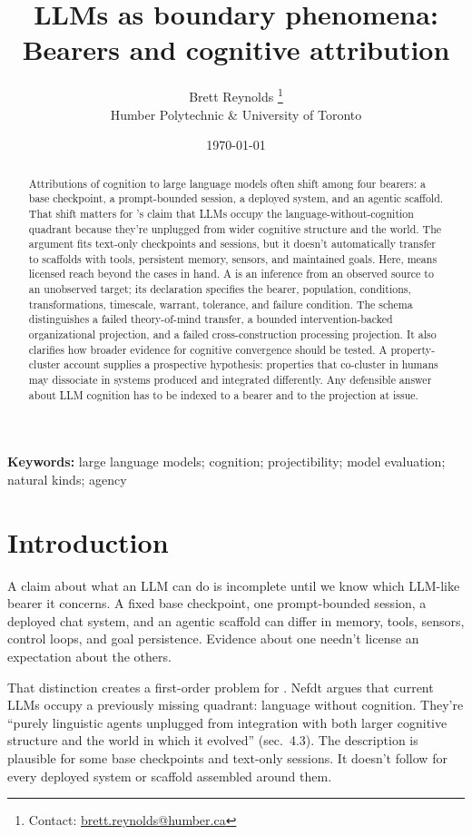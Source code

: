 \documentclass[12pt]{article}
\title{LLMs as boundary phenomena: Bearers and cognitive attribution}
\author{Brett Reynolds \orcidlink{0000-0003-0073-7195}%
\thanks{Contact: \href{mailto:brett.reynolds@humber.ca}{brett.reynolds@humber.ca}}\\
Humber Polytechnic \& University of Toronto}
\date{\today}
\begin{document}
\maketitle

\begin{abstract}
Attributions of cognition to large language models often shift among four bearers: a base checkpoint, a prompt-bounded session, a deployed system, and an agentic scaffold. That shift matters for \textcite{nefdt2026}'s claim that LLMs occupy the language-without-cognition quadrant because they're unplugged from wider cognitive structure and the world. The argument fits text-only checkpoints and sessions, but it doesn't automatically transfer to scaffolds with tools, persistent memory, sensors, and maintained goals. Here,  means licensed reach beyond the cases in hand. A  is an inference from an observed source to an unobserved target; its declaration specifies the bearer, population, conditions, transformations, timescale, warrant, tolerance, and failure condition. The schema distinguishes a failed theory-of-mind transfer, a bounded intervention-backed organizational projection, and a failed cross-construction processing projection. It also clarifies how broader evidence for cognitive convergence should be tested. A property-cluster account supplies a prospective hypothesis: properties that co-cluster in humans may dissociate in systems produced and integrated differently. Any defensible answer about LLM cognition has to be indexed to a bearer and to the projection at issue.
\end{abstract}

\noindent\textbf{Keywords:} large language models; cognition; projectibility; model evaluation; natural kinds; agency

\section{Introduction}

A claim about what an LLM can do is incomplete until we know which LLM-like bearer it concerns. A fixed base checkpoint, one prompt-bounded session, a deployed chat system, and an agentic scaffold can differ in memory, tools, sensors, control loops, and goal persistence. Evidence about one needn't license an expectation about the others.

That distinction creates a first-order problem for \textcite{nefdt2026}. Nefdt argues that current LLMs occupy a previously missing quadrant: language without cognition. They're \enquote{purely linguistic agents unplugged from integration with both larger cognitive structure and the world in which it evolved} (sec.~4.3). The description is plausible for some base checkpoints and text-only sessions. It doesn't follow for every deployed system or scaffold assembled around them.
\end{document}
